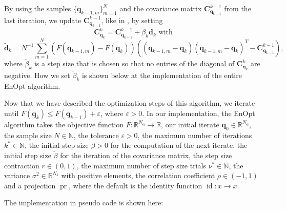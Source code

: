 By using the samples $\{\mathbf{q}_{k-1,m}\}_{m=1}^N$ and the covariance matrix $\mathbf{C}_{\mathbf{q}_{k-1}}^{k-1}$ from the last iteration, we update $\mathbf{C}_{\mathbf{q}_{k-1}}^{k-1}$, like in \cite{Stordal2016-cj}, by setting
\begin{displaymath}
\mathbf{C}_{\mathbf{q}_{k}}^{k}=\mathbf{C}_{\mathbf{q}_{k-1}}^{k-1}+\tilde{\beta}_k\tilde{\mathbf{d}}_k\text{ with}
\end{displaymath}
\begin{displaymath}
\tilde{\mathbf{d}}_k=N^{-1}\sum_{m=1}^N(F(\mathbf{q}_{k-1,m})-F(\mathbf{q}_k))((\mathbf{q}_{k-1,m}-\mathbf{q}_k)(\mathbf{q}_{k-1,m}-\mathbf{q}_k)^T-\mathbf{C}_{\mathbf{q}_{k-1}}^{k-1}),
\end{displaymath}
where $\tilde{\beta}_k$ is a step size that is chosen so that no entries of the diagonal of $\mathbf{C}_{\mathbf{q}_{k}}^{k}$ are negative. How we set $\tilde{\beta}_k$ is shown below at the implementation of the entire EnOpt algorithm.

Now that we have described the optimization steps of this algorithm, we iterate until $F(\mathbf{q}_k)\leq F(\mathbf{q}_{k-1})+\varepsilon$, where $\varepsilon>0$. In our implementation, the EnOpt algorithm takes the objective function $F:\mathbb{R}^{N_\mathbf{q}}\to\mathbb{R}$, our initial iterate $\mathbf{q}_0\in\mathbb{R}^{N_\mathbf{q}}$, the sample size $N\in\mathbb{N}$, the tolerance $\varepsilon>0$, the maximum number of iterations $k^*\in\mathbb{N}$, the initial step size $\beta>0$ for the computation of the next iterate, the initial step size $\tilde{\beta}$ for the iteration of the covariance matrix, the step size contraction $r\in(0,1)$, the maximum number of step size trials $\nu^*\in\mathbb{N}$, the variance $\sigma^2\in\mathbb{R}^{N_b}$ with positive elements, the correlation coefficient $\rho\in(-1,1)$ and a projection $\operatorname{pr}$, where the default is the identity function $\operatorname{id}:x\to x$.

The implementation in pseudo code is shown here:

